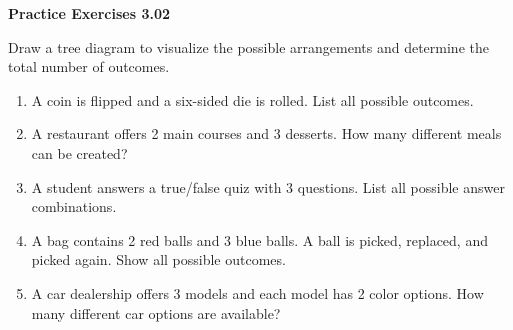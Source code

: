 \vspace{0.3ex}
\noindent\textbf{Practice Exercises 3.02}

\vspace{0.2ex}

Draw a tree diagram to visualize the possible arrangements and determine the total number of outcomes.

\begin{enumerate}[label=\color{blue}\arabic*.]
    \item A coin is flipped and a six-sided die is rolled. List all possible outcomes.
    \item A restaurant offers 2 main courses and 3 desserts. How many different meals can be created?
    \item A student answers a true/false quiz with 3 questions. List all possible answer combinations.
    \item A bag contains 2 red balls and 3 blue balls. A ball is picked, replaced, and picked again. Show all possible outcomes.
    \item A car dealership offers 3 models and each model has 2 color options. How many different car options are available?
\end{enumerate}
